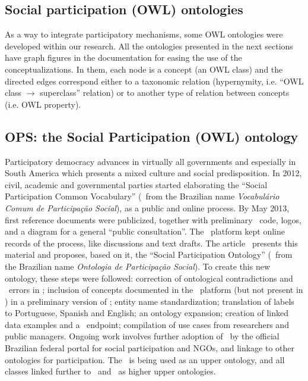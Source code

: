 \begin{apendicesenv}
\section{Social participation (OWL) ontologies}\label{sec:spont}
As a way to integrate participatory mechanisms, some OWL ontologies were developed within our research.
All the ontologies presented in the next sections have graph figures in the documentation for easing the use of
the conceptualizations.
In them, each node is a concept (an OWL class) and the directed edges correspond either to a taxonomic relation
(hypernymity, i.e. ``OWL class $\rightarrow$ superclass'' relation) or to another type of relation between concepts (i.e. OWL property).

\subsection{OPS: the Social Participation (OWL) ontology}
Participatory democracy advances in virtually all governments and especially in South America which presents a mixed culture and social predisposition.
 In 2012, civil, academic and governmental parties started elaborating the ``Social Participation Common Vocabulary'' (\vcps\ from the Brazilian name \emph{Vocabul\'ario Comum de Participa\c{c}\~ao Social}), as a public and online process. By May 2013, first reference documents were publicized, together with preliminary \owl\ code, logos, and a diagram for a general ``public consultation''.
The \corais\ platform kept online records of the process, like discussions and text drafts. 
The article~\cite{ops} presents this material and proposes, based on it, the ``Social Participation Ontology'' (\ops\ from the Brazilian name \emph{Ontologia de Participa\c{c}\~ao Social}). To create  this new ontology, these steps were followed: correction of ontological contradictions and \owl\ errors in \vcps; inclusion of concepts documented in the \corais\ platform (but not present in \vcps) in a preliminary version of \ops; entity name standardization; translation of labels to Portuguese, Spanish and English; an ontology expansion; creation of linked data examples and  a \sparql\ endpoint; compilation of use cases from researchers and public managers. Ongoing work involves further adoption of \ops\ by the official Brazilian federal portal for social participation and  NGOs, and linkage to other ontologies for participation. The \ops\ is being used as an upper ontology, and all classes linked further to \foaf\ and \bfo\ as higher upper ontologies.


\end{apendicesenv}
